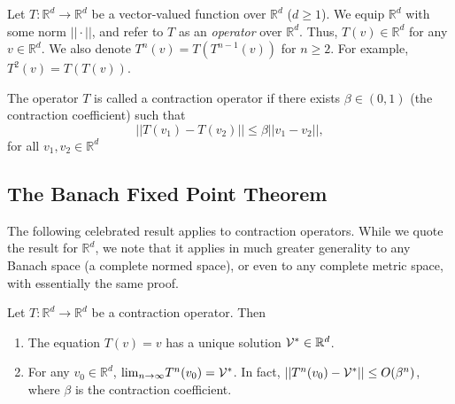 Let $T:\mathbb R^d \to \mathbb R^d$  be a vector-valued function
over $\mathbb R^d$   ($d \ge 1$).
%
We equip $\mathbb R^d$ with some norm $||
\cdot ||$, and refer to $T$ as an \emph{operator } over $\mathbb
R^d$. Thus, $T(v) \in \mathbb R^d$ for any $v \in \mathbb R^d$. We
also denote ${T^n}(v) = T({T^{n - 1}}(v))$ for  $n \ge 2$. For
example, ${T^2}(v) = T(T(v))$.

\begin{definition} The operator $T$ is called a contraction operator if there exists $\beta  \in (0,1)$ (the contraction coefficient) such that
                            \[||T({v_1}) - T({v_2})|| \le \beta ||{v_1} - {v_2}||,\]
                            for all $v_1,v_2 \in \mathbb R^d$
\end{definition}

\subsection{The Banach Fixed Point Theorem}
The following celebrated result applies to contraction operators. While we quote the result for $\mathbb R^d$, we note that it applies in much greater generality to any Banach space (a complete normed space), or even to any complete metric space, with essentially the same proof.

\begin{theorem}
\label{chapter-discount:thm:Banach}
 Let $T:\mathbb R^d \to \mathbb R^d$  be a
contraction operator. Then
\begin{enumerate}
  \item The equation $T(v) = v$ has a unique solution  $\mathcal{V}^*\in \mathbb R^d$.
  \item For any $v_0 \in \mathbb R^d$,  ${\lim _{n \to \infty }}{T^n}({v_0}) = {\mathcal{V}^*}$.
          In fact,  $||{T^n}({v_0}) - {\mathcal{V}^*}|| \le O({\beta ^n})$, where $\beta $ is the contraction coefficient.
\end{enumerate}
\end{theorem}

